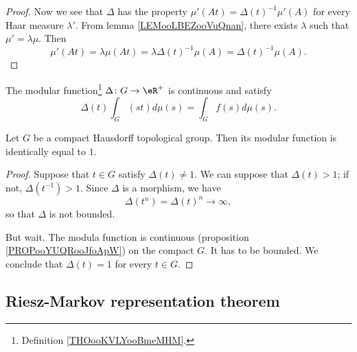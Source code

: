 \begin{proof}
	Now we see that \( \Delta\) has the property \( \mu'(At)=\Delta(t)^{-1}\mu'(A)\) for every Haar measure \( \lambda'\). From lemma \ref{LEMooLBEZooVuQnan}, there exists \( \lambda\) such that \( \mu'=\lambda\mu\). Then
	\begin{equation}
		\mu'(At)=\lambda\mu(At)=\lambda \Delta(t)^{-1}\mu(A)=\Delta(t)^{-1}\mu(A).
	\end{equation}
\end{proof}

\begin{proposition}       \label{PROPooYUQRooJfoApW}
	The modular function\footnote{Definition \ref{THOooKVLYooBmeMHM}.} \( \Delta\colon G\to \eR^+\) is continuous and satisfy
	\begin{equation}
		\Delta(t)\int_G(st)d\mu(s)=\int_Gf(s)d\mu(s).
	\end{equation}
\end{proposition}

\begin{lemma}     \label{LEMooRNXNooOPbzfN}
	Let \( G\) be a compact Hausdorff topological group. Then its modular function is identically equal to \( 1\).
\end{lemma}

\begin{proof}
	Suppose that \( t\in G\) satisfy \( \Delta(t)\neq 1\). We can suppose that \( \Delta(t)>1\); if not, \( \Delta(t^{-1})>1\). Since \( \Delta\) is a morphism, we have
	\begin{equation}
		\Delta(t^n)=\Delta(t)^n\to \infty,
	\end{equation}
	so that \( \Delta\) is not bounded.

	But wait. The modula function is continuous (proposition \ref{PROPooYUQRooJfoApW}) on the compact \( G\). It has to be bounded. We conclude that \( \Delta(t)=1\) for every \( t\in G\).
\end{proof}


\subsection{Riesz-Markov representation theorem}

